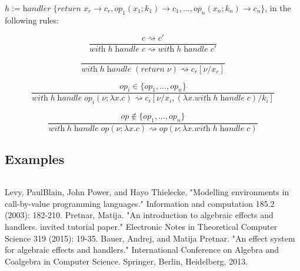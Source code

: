 \documentclass[12pt]{article}
\newcommand\eop[0]{\textit{op}}
\newcommand\val[0]{\nu}
\newcommand\vabs[2]{\lambda #1 . #2}
\newcommand\vhandler[1]{\textit{handler} \; \{#1\}}
\newcommand\comp[0]{c}
\newcommand\creturn[1]{\textit{return} \; #1}
\newcommand\cop[4]{#1(#2 ; \lambda #3 . #4)}
\newcommand\chandle[2]{\textit{with} \; #1 \; \textit{handle} \; #2}
\begin{document}
\vspace{20pt}
$h := \vhandler{
		\textit{return} \; x_r \rightarrow \comp_r,
		\eop_1 (  x_1 ; k_1 ) \rightarrow \comp_1,
		...,
		\eop_n ( x_n ; k_n ) \rightarrow \comp_n
	}$, in the following rules:\\
	
\begin{minipage}{0.5\textwidth}
\[\frac{
	\comp \rightsquigarrow \comp'
}{
	\chandle{h}{\comp} \rightsquigarrow \chandle{h}{\comp'}
}\]
\end{minipage}
\begin{minipage}{0.5\textwidth}
\[\frac{
}{
	\chandle{h}{(\creturn{\val})} \rightsquigarrow \comp_r[\val / x_r]
}\]
\end{minipage}
\vspace{20pt}
\[\frac{
	\eop_i \in \{ \eop_1, ..., \eop_n \}
}{
	\chandle{h}{\cop{\eop_i}{\val}{x}{\comp}} \rightsquigarrow \comp_i[\val / x_i, (\vabs{x}{\chandle{h}{\comp}}) / k_i]
}\]

\[\frac{
	\eop \notin \{ \eop_1, ..., \eop_n \}
}{
	\chandle{h}{\cop{\eop}{\val}{x}{\comp}} \rightsquigarrow \cop{\eop}{\val}{x}{\chandle{h}{\comp}}
}\]

\subsection{Examples}
\inputminted{haskell}{code3.txt}

\begin{thebibliography}{9}
Levy, PaulBlain, John Power, and Hayo Thielecke. "Modelling environments in call-by-value programming languages." Information and computation 185.2 (2003): 182-210.
Pretnar, Matija. "An introduction to algebraic effects and handlers. invited tutorial paper." Electronic Notes in Theoretical Computer Science 319 (2015): 19-35.
Bauer, Andrej, and Matija Pretnar. "An effect system for algebraic effects and handlers." International Conference on Algebra and Coalgebra in Computer Science. Springer, Berlin, Heidelberg, 2013.
\end{thebibliography}
\end{document}
